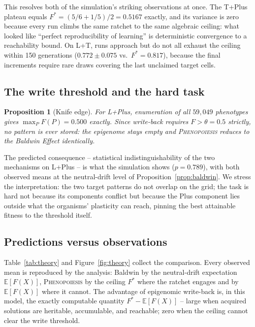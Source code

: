\documentclass[11pt]{article}
\newtheorem{proposition}{Proposition}
\newcommand{\Pheno}{\textsc{Phenopoiesis}}
\begin{document}
This resolves both of the simulation's striking observations at once. The
T+Plus plateau equals $F^* = (5/6 + 1/5)/2 = 0.5167$ exactly, and its
variance is zero because every run climbs the same ratchet to the same
algebraic ceiling: what looked like ``perfect reproducibility of learning''
is deterministic convergence to a reachability bound. On L+T, runs approach
but do not all exhaust the ceiling within 150 generations
($0.772 \pm 0.075$ vs.\ $F^* = 0.817$), because the final increments require
rare draws covering the last unclaimed target cells.

\subsection{The write threshold and the hard task}

\begin{proposition}[Knife edge]\label{prop:knife}
For L+Plus, enumeration of all $59{,}049$ phenotypes gives
$\max_P F(P) = 0.500$ exactly. Since write-back requires $F > \theta = 0.5$
strictly, no pattern is ever stored: the epigenome stays empty and \Pheno{}
reduces to the Baldwin Effect identically.
\end{proposition}

The predicted consequence -- statistical indistinguishability of the two
mechanisms on L+Plus -- is what the simulation shows ($p = 0.789$), with both
observed means at the neutral-drift level of
Proposition~\ref{prop:baldwin}. We stress the interpretation: the two target
patterns do not overlap on the grid; the task is hard not because its
components conflict but because the Plus component lies outside what the
organisms' plasticity can reach, pinning the best attainable fitness to the
threshold itself.

\subsection{Predictions versus observations}

Table~\ref{tab:theory} and Figure~\ref{fig:theory} collect the comparison.
Every observed mean is reproduced by the analysis: Baldwin by the
neutral-drift expectation $\mathbb{E}[F(X)]$, \Pheno{} by the ceiling $F^*$
where the ratchet engages and by $\mathbb{E}[F(X)]$ where it cannot. The
advantage of epigenomic write-back is, in this model, the exactly computable
quantity $F^* - \mathbb{E}[F(X)]$ -- large when acquired solutions are
heritable, accumulable, and reachable; zero when the ceiling cannot clear
the write threshold.
\end{document}
